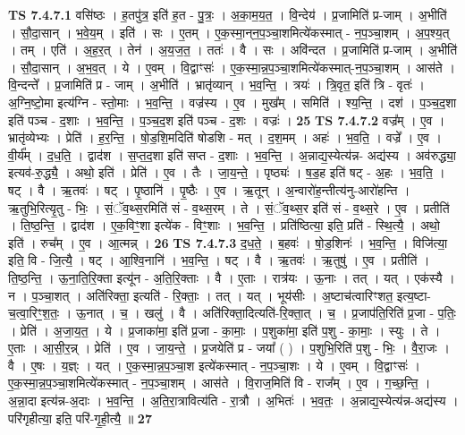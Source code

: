 \documentclass[17pt]{extarticle}
\begin{document}
                                \textbf{ TS 7.4.7.1} \newline
                  वसि॑ष्ठः । ह॒तपु॑त्र॒ इति॑ ह॒त - पु॒त्रः॒ । अ॒का॒म॒य॒त॒ । वि॒न्देय॑ । प्र॒जामिति॑ प्र-जाम् । अ॒भीति॑ । सौ॒दा॒सान् । भ॒वे॒य॒म् । इति॑ । सः । ए॒तम् । ए॒क॒स्मा॒न्‌न॒प॒ञ्चा॒शमित्ये॑कस्मात् - न॒प॒ञ्चा॒शम् । अ॒प॒श्य॒त् । तम् । एति॑ । अ॒ह॒र॒त् । तेन॑ । अ॒य॒ज॒त॒ । ततः॑ । वै । सः । अवि॑न्दत । प्र॒जामिति॑ प्र-जाम् । अ॒भीति॑ । सौ॒दा॒सान् । अ॒भ॒व॒त् । ये । ए॒वम् । वि॒द्वाꣳसः॑ । ए॒क॒स्मा॒न्न॒प॒ञ्चा॒शमित्ये॑कस्मात्-न॒प॒ञ्चा॒शम् । आस॑ते । वि॒न्दन्ते᳚ । प्र॒जामिति॑ प्र - जाम् । अ॒भीति॑ । भ्रातृ॑व्यान् । भ॒व॒न्ति॒ । त्रयः॑ । त्रि॒वृत॒ इति॑ त्रि - वृतः॑ । अ॒ग्नि॒ष्टो॒मा इत्य॑ग्नि - स्तो॒माः । भ॒व॒न्ति॒ । वज्र॑स्य । ए॒व । मुख᳚म् । समिति॑ । श्य॒न्ति॒ । दश॑ । प॒ञ्च॒द॒शा इति॑ पञ्च - द॒शाः । भ॒व॒न्ति॒ । प॒ञ्च॒द॒श इति॑ पञ्च - द॒शः । वज्रः॑ । \textbf{  25} \newline
                  \newline
                                \textbf{ TS 7.4.7.2} \newline
                  वज्र᳚म् । ए॒व । भ्रातृ॑व्येभ्यः । प्रेति॑ । ह॒र॒न्ति॒ । षो॒ड॒शि॒मदिति॑ षोडशि - मत् । द॒श॒मम् । अहः॑ । भ॒व॒ति॒ । वज्रे᳚ । ए॒व । वी॒र्य᳚म् । द॒ध॒ति॒ । द्वाद॑श । स॒प्त॒द॒शा इति॑ सप्त - द॒शाः । भ॒व॒न्ति॒ । अ॒न्नाद्य॒स्येत्य॑न्न- अद्य॑स्य । अव॑रुद्ध्या॒ इत्यव॑-रु॒द्ध्यै॒ । अथो॒ इति॑ । प्रेति॑ । ए॒व । तैः । जा॒य॒न्ते॒ । पृष्ठ्यः॑ । ष॒ड॒ह इति॑ षट् - अ॒हः । भ॒व॒ति॒ । षट् । वै । ऋ॒तवः॑ । षट् । पृ॒ष्ठानि॑ । पृ॒ष्ठैः । ए॒व । ऋ॒तून् । अ॒न्वारो॑ह॒न्तीत्य॑नु-आरो॑हन्ति । ऋ॒तुभि॒रित्यृ॒तु - भिः॒ । सं॒ॅव॒थ्स॒रमिति॑ सं - व॒थ्स॒रम् । ते । सं॒ॅव॒थ्स॒र इति॑ सं - व॒थ्स॒रे । ए॒व । प्रतीति॑ । ति॒ष्ठ॒न्ति॒ । द्वाद॑श । ए॒क॒विꣳ॒॒शा इत्ये॑क - विꣳ॒॒शाः । भ॒व॒न्ति॒ । प्रति॑ष्ठित्या॒ इति॒ प्रति॑ - स्थि॒त्यै॒ । अथो॒ इति॑ । रुच᳚म् । ए॒व । आ॒त्मन्न् । \textbf{  26} \newline
                  \newline
                                \textbf{ TS 7.4.7.3} \newline
                  द॒ध॒ते॒ । ब॒हवः॑ । षो॒ड॒शिनः॑ । भ॒व॒न्ति॒ । विजि॑त्या॒ इति॒ वि - जि॒त्यै॒ । षट् । आ॒श्वि॒नानि॑ । भ॒व॒न्ति॒ । षट् । वै । ऋ॒तवः॑ । ऋ॒तुषु॑ । ए॒व । प्रतीति॑ । ति॒ष्ठ॒न्ति॒ । ऊ॒ना॒ति॒रि॒क्ता इत्यू॑न - अ॒ति॒रि॒क्ताः । वै । ए॒ताः । रात्र॑यः । ऊ॒नाः । तत् । यत् । एक॑स्यै । न । प॒ञ्चा॒शत् । अति॑रिक्ता॒ इत्यति॑ - रि॒क्ताः॒ । तत् । यत् । भूय॑सीः । अ॒ष्टाच॑त्वारिꣳशत॒ इत्य॒ष्टा-च॒त्वा॒रिꣳ॒॒श॒तः॒ । ऊ॒नात् । च॒ । खलु॑ । वै । अति॑रिक्ता॒दित्यति॑-रि॒क्ता॒त् । च॒ । प्र॒जाप॑ति॒रिति॑ प्र॒जा - प॒तिः॒ । प्रेति॑ । अ॒जा॒य॒त॒ । ये । प्र॒जाका॑मा॒ इति॑ प्र॒जा - का॒माः॒ । प॒शुका॑मा॒ इति॑ प॒शु - का॒माः॒ । स्युः । ते । ए॒ताः । आ॒सी॒र॒न्न् । प्रेति॑ । ए॒व । जा॒य॒न्ते॒ । प्र॒जयेति॑ प्र - जया᳚ ( ) । प॒शुभि॒रिति॑ प॒शु - भिः॒ । वै॒रा॒जः । वै । ए॒षः । य॒ज्ञ्ः । यत् । ए॒क॒स्मा॒न्न॒प॒ञ्चा॒श इत्ये॑कस्मात् - न॒प॒ञ्चा॒शः । ये । ए॒वम् । वि॒द्वाꣳसः॑ । ए॒क॒स्मा॒न्न॒प॒ञ्चा॒शमित्ये॑कस्मात् - न॒प॒ञ्चा॒शम् । आस॑ते । वि॒राज॒मिति॑ वि - राज᳚म् । ए॒व । ग॒च्छ॒न्ति॒ । अ॒न्ना॒दा इत्य॑न्न-अ॒दाः । भ॒व॒न्ति॒ । अ॒ति॒रा॒त्रावित्य॑ति - रा॒त्रौ । अ॒भितः॑ । भ॒व॒तः॒ । अ॒न्नाद्य॒स्येत्य॑न्न-अद्य॑स्य । परि॑गृहीत्या॒ इति॒ परि॑-गृ॒ही॒त्यै॒ ॥ \textbf{  27} \newline
\end{document}
